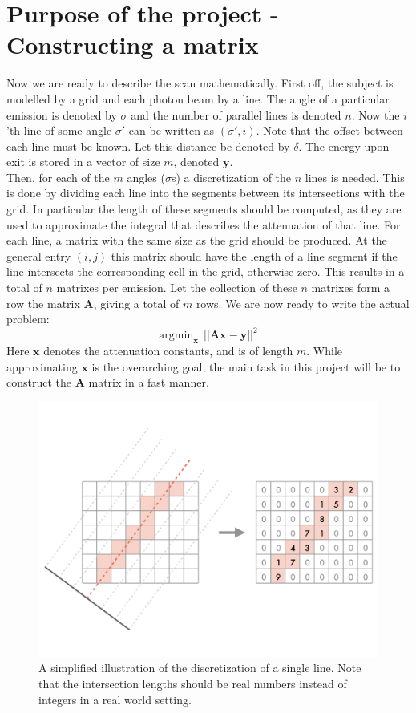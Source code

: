 \section{Purpose of the project - Constructing a matrix}
Now we are ready to describe the scan mathematically. 
First off, the subject is modelled by a grid and each photon beam by a line. 
The angle of a particular emission is denoted by $\sigma$ and the number of parallel lines is denoted $n$. Now the $i$'th line of some angle $\sigma'$ can be written as $(\sigma', i)$. Note that the offset between each line must be known. Let this distance be denoted by $\delta$. The energy upon exit is stored in a vector of size $m$, denoted $\mathbf{y}$.\\

Then, for each of the $m$ angles ($\sigma$s) a discretization of the $n$ lines is needed. This is done by dividing each line into the segments between its intersections with the grid. In particular the length of these segments should be computed, as they are used to approximate the integral that describes the attenuation of that line. For each line, a matrix with the same size as the grid should be produced. At the general entry $(i,j)$ this matrix should have the length of a line segment if the line intersects the corresponding cell in the grid, otherwise zero. This results in a total of $n$ matrixes per emission. 
Let the collection of these $n$ matrixes form a row the matrix $\mathbf{A}$, giving a total of $m$ rows. We are now ready to write the actual problem:
$$
  \text{argmin}_{\mathbf{x}} ~~ || \mathbf{Ax} - \mathbf{y} ||^{2}
$$
Here $\mathbf{x}$ denotes the attenuation constants, and is of length $m$.
While approximating $\mathbf{x}$ is the overarching goal, the main task in this project will be to construct the $\mathbf{A}$ matrix in a fast manner.

\begin{figure}[H]
  \centering
  \includegraphics[scale=0.35]{figures/line2matrix.png}
  \caption{A simplified illustration of the discretization of a single line. Note that the intersection lengths should be real numbers instead of integers in a real world setting.}
\end{figure}
